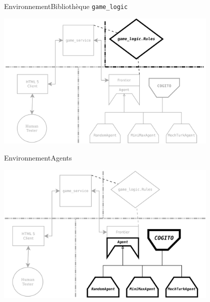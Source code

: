 \begin{frame}{Environnement}{Bibliothèque \texttt{game\_logic}}
\begin{center}
\includegraphics[width=0.8\textwidth]{img/william/archi_lib}\\
\end{center}
\end{frame}
\begin{frame}{Environnement}{Agents}
\begin{center}
\includegraphics[width=0.8\textwidth]{img/william/archi_agents}\\
\end{center}
\end{frame}
